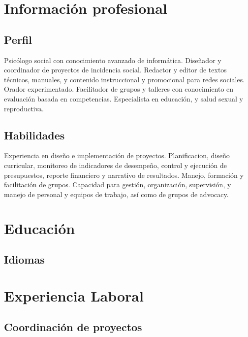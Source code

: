 \documentclass[xcolor=svgnames,color=DarkSlateGray]{komacv}
\begin{document}
\maketitle

\section{Información profesional}
\subsection{Perfil}
\raggedright
    Psicólogo social con conocimiento avanzado de informática. Diseñador y coordinador de proyectos de incidencia social. Redactor y editor de textos técnicos, manuales, y contenido instruccional y promocional para redes sociales. Orador experimentado. Facilitador de grupos y talleres con conocimiento en evaluación basada en competencias. Especialista en educación, y salud sexual y reproductiva.
\subsection{Habilidades}
\raggedright
    Experiencia en diseño e implementación de proyectos. Planificacion, diseño curricular, monitoreo de indicadores de desempeño, control y ejecución de presupuestos, reporte financiero y narrativo de resultados. Manejo, formación y facilitación de grupos. Capacidad para gestión, organización, supervisión, y manejo de personal y equipos de trabajo, así como de grupos de advocacy.

\section{Educación}

\subsection{Idiomas}

\section{Experiencia Laboral}
\subsection{Coordinación de proyectos}
\end{document}
